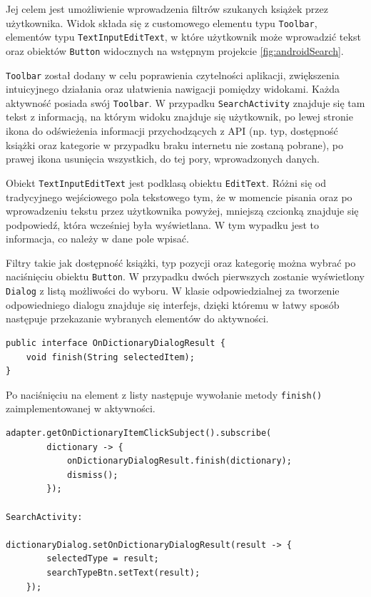 \documentclass[twoside]{projektInzynierskiMS}
\begin{document}
Jej celem jest umożliwienie wprowadzenia filtrów szukanych książek przez użytkownika. Widok składa się z customowego elementu typu \verb`Toolbar`, elementów typu  \verb`TextInputEditText`, w które użytkownik może wprowadzić tekst oraz obiektów \verb`Button` widocznych na wstępnym projekcie \ref{fig:androidSearch}.

\verb`Toolbar` został dodany w celu poprawienia czytelności aplikacji, zwiększenia intuicyjnego działania oraz ułatwienia nawigacji pomiędzy widokami. Każda aktywność posiada swój \verb`Toolbar`. W przypadku \verb`SearchActivity` znajduje się tam tekst z informacją, na którym widoku znajduje się użytkownik, po lewej stronie ikona do odświeżenia informacji przychodzących z API (np. typ, dostępność książki oraz kategorie w przypadku braku internetu nie zostaną pobrane), po prawej ikona usunięcia wszystkich, do tej pory, wprowadzonych danych. 

Obiekt \verb`TextInputEditText` \cite{textInputEditText} jest podklasą obiektu \verb`EditText`. Różni się od tradycyjnego wejściowego pola tekstowego tym, że w momencie pisania oraz po wprowadzeniu tekstu przez użytkownika powyżej, mniejszą czcionką znajduje się podpowiedź, która wcześniej była wyświetlana. W tym wypadku jest to informacja, co należy w dane pole wpisać.

Filtry takie jak dostępność książki, typ pozycji oraz kategorię można wybrać po naciśnięciu obiektu \verb`Button`. W przypadku dwóch pierwszych zostanie wyświetlony \verb`Dialog` z listą możliwości do wyboru. W klasie odpowiedzialnej za tworzenie odpowiedniego dialogu znajduje się interfejs, dzięki któremu w łatwy sposób następuje przekazanie wybranych elementów do aktywności.
\begin{verbatim}
public interface OnDictionaryDialogResult {
    void finish(String selectedItem);
}
\end{verbatim} 

Po naciśnięciu na element z listy następuje wywołanie metody \verb`finish()` zaimplementowanej w aktywności.
\begin{verbatim}
adapter.getOnDictionaryItemClickSubject().subscribe(
        dictionary -> {
            onDictionaryDialogResult.finish(dictionary);
            dismiss();
        });

SearchActivity:

dictionaryDialog.setOnDictionaryDialogResult(result -> {
        selectedType = result;
        searchTypeBtn.setText(result);
    });
\end{verbatim} 
\end{document}
